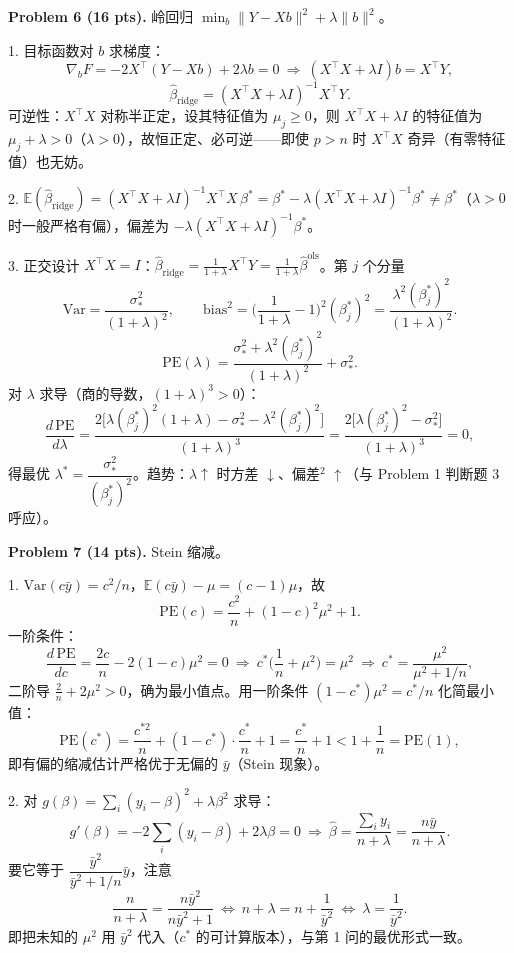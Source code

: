 \documentclass[11pt]{ctexart}
\newcommand{\ans}[1]{{\color{red}#1}}
\begin{document}
\noindent\textbf{Problem 6 (16 pts).} 岭回归 $\min_b \|Y - Xb\|^2 + \lambda\|b\|^2$。

\ans{
1. 目标函数对 $b$ 求梯度：
\[
\nabla_b F = -2X^{\top}(Y - Xb) + 2\lambda b = 0 \ \Longrightarrow\ (X^{\top}X + \lambda I)b = X^{\top}Y,
\]
\[
\hat\beta_{\mathrm{ridge}} = (X^{\top}X + \lambda I)^{-1}X^{\top}Y.
\]
可逆性：$X^{\top}X$ 对称半正定，设其特征值为 $\mu_j \geq 0$，则 $X^{\top}X + \lambda I$ 的特征值为 $\mu_j + \lambda > 0$（$\lambda > 0$），故恒正定、必可逆——即使 $p > n$ 时 $X^{\top}X$ 奇异（有零特征值）也无妨。

2. $\mathbb{E}(\hat\beta_{\mathrm{ridge}}) = (X^{\top}X + \lambda I)^{-1}X^{\top}X\,\beta^* = \beta^* - \lambda(X^{\top}X + \lambda I)^{-1}\beta^* \neq \beta^*$（$\lambda > 0$ 时一般严格有偏），偏差为 $-\lambda(X^{\top}X + \lambda I)^{-1}\beta^*$。

3. 正交设计 $X^{\top}X = I$：$\hat\beta_{\mathrm{ridge}} = \frac{1}{1+\lambda}X^{\top}Y = \frac{1}{1+\lambda}\hat\beta^{\mathrm{ols}}$。第 $j$ 个分量
\[
\mathrm{Var} = \frac{\sigma_*^2}{(1+\lambda)^2}, \qquad \mathrm{bias}^2 = \Big(\frac{1}{1+\lambda} - 1\Big)^2 (\beta_j^*)^2 = \frac{\lambda^2(\beta_j^*)^2}{(1+\lambda)^2}.
\]
\[
\mathrm{PE}(\lambda) = \frac{\sigma_*^2 + \lambda^2(\beta_j^*)^2}{(1+\lambda)^2} + \sigma_*^2.
\]
对 $\lambda$ 求导（商的导数，$(1+\lambda)^3 > 0$）：
\[
\frac{d\,\mathrm{PE}}{d\lambda} = \frac{2\big[\lambda(\beta_j^*)^2(1+\lambda) - \sigma_*^2 - \lambda^2(\beta_j^*)^2\big]}{(1+\lambda)^3} = \frac{2\big[\lambda(\beta_j^*)^2 - \sigma_*^2\big]}{(1+\lambda)^3} = 0,
\]
得最优 $\lambda^* = \dfrac{\sigma_*^2}{(\beta_j^*)^2}$。趋势：$\lambda \uparrow$ 时方差 $\downarrow$、偏差$^2$ $\uparrow$（与 Problem 1 判断题 3 呼应）。
}

\noindent\textbf{Problem 7 (14 pts).} Stein 缩减。

\ans{
1. $\mathrm{Var}(c\bar{y}) = c^2/n$，$\mathbb{E}(c\bar{y}) - \mu = (c-1)\mu$，故
\[
\mathrm{PE}(c) = \frac{c^2}{n} + (1-c)^2\mu^2 + 1.
\]
一阶条件：
\[
\frac{d\,\mathrm{PE}}{dc} = \frac{2c}{n} - 2(1-c)\mu^2 = 0 \ \Longrightarrow\ c^*\Big(\frac{1}{n} + \mu^2\Big) = \mu^2 \ \Longrightarrow\ c^* = \frac{\mu^2}{\mu^2 + 1/n},
\]
二阶导 $\frac{2}{n} + 2\mu^2 > 0$，确为最小值点。用一阶条件 $(1-c^*)\mu^2 = c^*/n$ 化简最小值：
\[
\mathrm{PE}(c^*) = \frac{c^{*2}}{n} + (1-c^*)\cdot\frac{c^*}{n} + 1 = \frac{c^*}{n} + 1 < 1 + \frac{1}{n} = \mathrm{PE}(1),
\]
即有偏的缩减估计严格优于无偏的 $\bar{y}$（Stein 现象）。

2. 对 $g(\beta) = \sum_i(y_i - \beta)^2 + \lambda\beta^2$ 求导：
\[
g'(\beta) = -2\sum_i(y_i - \beta) + 2\lambda\beta = 0 \ \Longrightarrow\ \hat\beta = \frac{\sum_i y_i}{n+\lambda} = \frac{n\bar{y}}{n+\lambda}.
\]
要它等于 $\dfrac{\bar{y}^2}{\bar{y}^2 + 1/n}\bar{y}$，注意
\[
\frac{n}{n+\lambda} = \frac{n\bar{y}^2}{n\bar{y}^2 + 1} \ \Longleftrightarrow\ n + \lambda = n + \frac{1}{\bar{y}^2} \ \Longleftrightarrow\ \lambda = \frac{1}{\bar{y}^2}.
\]
即把未知的 $\mu^2$ 用 $\bar{y}^2$ 代入（$c^*$ 的可计算版本），与第 1 问的最优形式一致。
}
\end{document}
